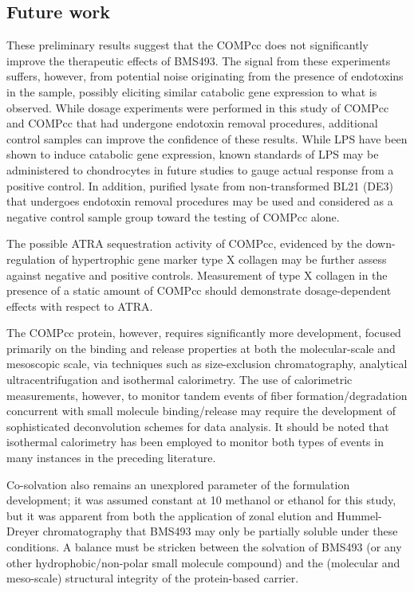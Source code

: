 \begin{refsection}
\subsection{Future work}
\label{sec:future_work_endotoxin}
These preliminary results suggest that the COMPcc does not significantly improve
the therapeutic effects of BMS493. The signal from these experiments suffers,
however, from potential noise originating from the presence of endotoxins in the
sample, possibly eliciting similar catabolic gene expression to what is
observed. While dosage experiments were performed in this study of COMPcc and
COMPcc that had undergone endotoxin removal procedures, additional control
samples can improve the confidence of these results. While LPS have been shown
to induce catabolic gene expression, known standards of LPS may be administered
to chondrocytes in future studies to gauge actual response from a positive
control. In addition, purified lysate from non-transformed BL21 (DE3)
 that undergoes endotoxin removal procedures may be used and
considered as a negative control sample group toward the testing of COMPcc
alone.

\label{sec:future_work_ATRA_sequestration}
The possible ATRA sequestration activity of COMPcc, evidenced by the
down-regulation of hypertrophic gene marker type X collagen may be further
assess against negative and positive controls. Measurement of type X collagen in
the presence of a static amount of COMPcc should demonstrate dosage-dependent
effects with respect to ATRA. 

The COMPcc protein, however, requires significantly more development, focused
primarily on the binding and release properties at both the molecular-scale and
mesoscopic scale, via techniques such as size-exclusion chromatography,
analytical ultracentrifugation and isothermal calorimetry. The use of
calorimetric measurements, however, to monitor tandem events of fiber
formation/degradation concurrent with small molecule binding/release may require
the development of sophisticated deconvolution schemes for data analysis. It
should be noted that isothermal calorimetry has been employed to monitor both
types of events in many instances in the preceding literature.\cite{Kardos2004}

Co-solvation also remains an unexplored parameter of the formulation
development; it was assumed constant at \SI{10}{\volper} methanol or ethanol for
this study, but it was apparent from both the application of zonal elution and
Hummel-Dreyer chromatography that BMS493 may only be partially soluble under
these conditions. A balance must be stricken between the solvation of BMS493 (or
any other hydrophobic/non-polar small molecule compound) and the (molecular and
meso-scale) structural integrity of the protein-based carrier.

\printbibliography[heading=subbibliography]

\end{refsection}
